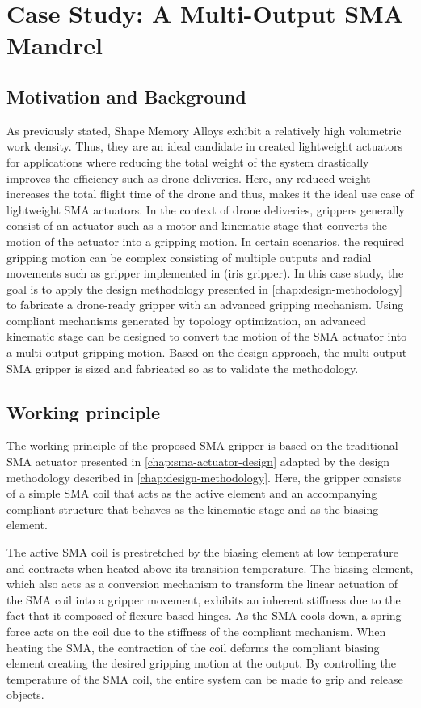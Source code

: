 \section{Case Study: A Multi-Output SMA Mandrel}\label{sec:smacm-mandrel}
\subsection{Motivation and Background}
As previously stated, Shape Memory Alloys exhibit a relatively high volumetric work density. Thus, they are an ideal candidate in created lightweight actuators for applications where reducing the total weight of the system drastically improves the efficiency such as drone deliveries. Here, any reduced weight increases the total flight time of the drone and thus, makes it the ideal use case of lightweight SMA actuators.
In the context of drone deliveries, grippers generally consist of an actuator such as a motor and kinematic stage that converts the motion of the actuator into a gripping motion. In certain scenarios, the required gripping motion can be complex consisting of multiple outputs and radial movements such as gripper implemented in \todocite (iris gripper).
In this case study, the goal is to apply the design methodology presented in \cref{chap:design-methodology} to fabricate a drone-ready gripper with an advanced gripping mechanism. Using compliant mechanisms generated by topology optimization, an advanced kinematic stage can be designed to convert the motion of the SMA actuator into a multi-output gripping motion. Based on the design approach, the multi-output SMA gripper is sized and fabricated so as to validate the methodology.
\subsection{Working principle}
The working principle of the proposed SMA gripper is based on the traditional SMA actuator presented in \cref{chap:sma-actuator-design} adapted by the design methodology described in \cref{chap:design-methodology}. Here, the gripper consists of a simple SMA coil that acts as the active element and an accompanying compliant structure that behaves as the kinematic stage and as the biasing element.

The active SMA coil is prestretched by the biasing element at low temperature and contracts when heated above its transition temperature. The biasing element, which also acts as a conversion mechanism to transform the linear actuation of the SMA coil into a gripper movement, exhibits an inherent stiffness due to the fact that it composed of flexure-based hinges. As the SMA cools down, a spring force acts on the coil due to the stiffness of the compliant mechanism. When heating the SMA, the contraction of the coil deforms the compliant biasing element creating the desired gripping motion at the output. By controlling the temperature of the SMA coil, the entire system can be made to grip and release objects.

